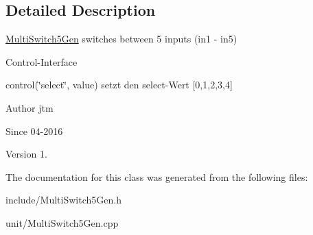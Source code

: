 \subsection{Detailed Description}
\hyperlink{classunit_1_1MultiSwitch5Gen}{Multi\-Switch5\-Gen} switches between 5 inputs (in1 -\/ in5)

Control-\/\-Interface


\begin{DoxyItemize}
\item control(\char`\"{}select\char`\"{}, value) setzt den select-\/\-Wert \mbox{[}0,1,2,3,4\mbox{]}
\end{DoxyItemize}

\begin{DoxyAuthor}{Author}
jtm 
\end{DoxyAuthor}
\begin{DoxySince}{Since}
04-\/2016 
\end{DoxySince}
\begin{DoxyVersion}{Version}
1. 
\end{DoxyVersion}


The documentation for this class was generated from the following files\-:\begin{DoxyCompactItemize}
\item 
include/Multi\-Switch5\-Gen.\-h\item 
unit/Multi\-Switch5\-Gen.\-cpp\end{DoxyCompactItemize}
